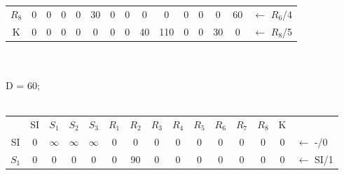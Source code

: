 \documentclass[12pt]{article}
\begin{document}
\begin{enumerate}
\begin{tabular}{|c|c|c|c|c|c|c|c|c|c|c|c|c|c|l}
$R_8$ & 0   & {\color[HTML]{000000} 0}        & {\color[HTML]{000000} 0}        & {\color[HTML]{000000} 0}        & {\color[HTML]{000000} 30}  & {\color[HTML]{000000} 0}   & {\color[HTML]{000000} 0}   & {\color[HTML]{000000} 0}  & {\color[HTML]{000000} 0}   & {\color[HTML]{000000} 0}  & {\color[HTML]{000000} 0}   & {\color[HTML]{000000} 0}   & {\color[HTML]{FE0000} 60}  & ${\leftarrow}$ $R_6$/4 \\ \cline{1-14}
K     & 0   & {\color[HTML]{000000} 0}        & {\color[HTML]{000000} 0}        & {\color[HTML]{000000} 0}        & {\color[HTML]{000000} 0}   & {\color[HTML]{000000} 0}   & {\color[HTML]{000000} 0}   & {\color[HTML]{000000} 40} & {\color[HTML]{000000} 110} & {\color[HTML]{000000} 0}  & {\color[HTML]{000000} 0}   & {\color[HTML]{000000} 30}  & {\color[HTML]{000000} 0}   & ${\leftarrow}$ $R_8$/5 \\ \cline{1-14}
\end{tabular}
\\
\\
D = 60;
\\
\\
\begin{tabular}{|c|c|c|c|c|c|c|c|c|c|c|c|c|c|l}
\cline{1-14}
      & SI  & $S_1$                           & $S_2$                           & $S_3$                           & $R_1$                      & $R_2$                      & $R_3$                      & $R_4$                     & $R_5$                      & $R_6$                     & $R_7$                      & $R_8$                      & K                          &                        \\ \cline{1-14}
SI    & 0   & {\color[HTML]{000000} $\infty$} & {\color[HTML]{000000} $\infty$} & {\color[HTML]{FE0000} $\infty$} & {\color[HTML]{000000} 0}   & {\color[HTML]{000000} 0}   & {\color[HTML]{000000} 0}   & {\color[HTML]{000000} 0}  & {\color[HTML]{000000} 0}   & {\color[HTML]{000000} 0}  & {\color[HTML]{000000} 0}   & {\color[HTML]{000000} 0}   & {\color[HTML]{000000} 0}   & ${\leftarrow}$ -/0     \\ \cline{1-14}
$S_1$ & 0   & {\color[HTML]{000000} 0}        & {\color[HTML]{000000} 0}        & {\color[HTML]{000000} 0}        & {\color[HTML]{000000} 0}   & {\color[HTML]{000000} 90}  & {\color[HTML]{000000} 0}   & {\color[HTML]{000000} 0}  & {\color[HTML]{000000} 0}   & {\color[HTML]{000000} 0}  & {\color[HTML]{000000} 0}   & {\color[HTML]{000000} 0}   & {\color[HTML]{000000} 0}   & ${\leftarrow}$ SI/1    \\ \cline{1-14}

\end{tabular}
\end{enumerate}
\end{document}

